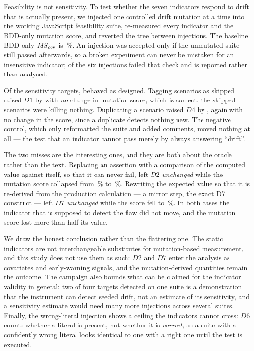 Feasibility is not sensitivity. To test whether the seven indicators respond to drift that is
actually present, we injected one controlled drift mutation at a time into the working JavaScript
feasibility suite, re-measured every indicator and the BDD-only mutation score, and reverted the tree
between injections. The baseline BDD-only $\mathit{MS}_{\mathrm{cov}}$ is \DriftBaseMsCov\,\%. An injection was accepted
only if the unmutated suite still passed afterwards, so a broken experiment can never be mistaken for
an insensitive indicator; \DriftInvalid{} of the six injections failed that check and is reported
rather than analysed.

Of the \DriftTargets{} sensitivity targets, \DriftDetected{} behaved as designed. Tagging scenarios as
skipped raised $\mathit{D1}$ by \DriftIoneDelta{} with \emph{no} change in mutation score, which is
correct: the skipped scenarios were killing nothing. Duplicating a scenario raised
$\mathit{D4}$ by \DriftIthreeDelta{}, again with no change in the score, since a duplicate detects
nothing new. The negative control, which only reformatted the suite and added comments, moved nothing
at all --- the test that an indicator cannot pass merely by always answering ``drift''.

The two misses are the interesting ones, and they are both about the oracle rather than the text.
Replacing an assertion with a comparison of the computed value against itself, so that it can never
fail, left $\mathit{D2}$ \emph{unchanged} while the mutation score collapsed from
\DriftBaseMsCov\,\% to \DriftItwoMsCov\,\%. Rewriting the expected value so that it is re-derived from
the production calculation --- a mirror step, the exact D7 construct --- left $\mathit{D7}$
\emph{unchanged} while the score fell to \DriftIfourMsCov\,\%. In both cases the indicator that is
supposed to detect the flaw did not move, and the mutation score lost more than half its value.

We draw the honest conclusion rather than the flattering one. The static indicators are not
interchangeable substitutes for mutation-based measurement, and this study does not use them as such:
$\mathit{D2}$ and $\mathit{D7}$ enter the analysis as covariates and early-warning signals, and the
mutation-derived quantities remain the outcome. The campaign also bounds what can be claimed for the
indicator validity in general: two of four targets detected on one suite is a demonstration that the
instrument can detect seeded drift, not an estimate of its sensitivity, and a sensitivity estimate
would need many more injections across several suites. Finally, the wrong-literal injection shows a
ceiling the indicators cannot cross: $\mathit{D6}$ counts whether a literal is present, not whether it
is \emph{correct}, so a suite with a confidently wrong literal looks identical to one with a right one
until the test is executed.

